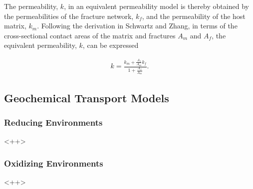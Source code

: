The permeability, $k$, in an equivalent permeability model is thereby obtained
by the permeabilities of the fracture network, $k_f$, and the permeability of
the host matrix, $k_m$. Following the derivation in Schwartz and Zhang, in
terms of the cross-sectional contact areas of the matrix and fractures $A_m$
and $A_f$, the equivalent permeability, $k$, can be expressed

\begin{align} k = \frac{k_m + \frac{A_f}{A_m}k_f}{1+\frac{A_f}{A_m}}.
\label{equivperm} \end{align}

\subsection{Geochemical Transport Models}

\subsubsection{Reducing Environments}

<++>



\subsubsection{Oxidizing Environments}

<++>





